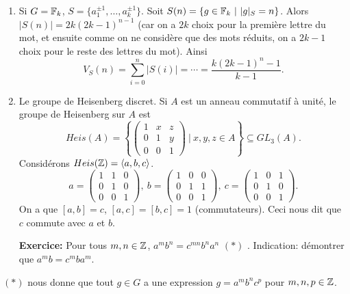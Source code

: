 \begin{exs}
\begin{enumerate}
      \item Si $G = \mathbb{F}_k$, $S = \{a_1^{\pm 1}, \ldots, a_k^{\pm 1}\}$. Soit $S(n) = \{g \in \mathbb{F}_k\ |\ |g|_S =
        n\}$. Alors $|S(n)| = 2k(2k-1)^{n-1}$ (car on a $2k$ choix pour la première lettre du mot, et ensuite
        comme on ne considère que des mots réduits, on a $2k-1$ choix pour le reste des lettres du mot). Ainsi
          \[V_S(n) = \sum_{i=0}^n |S(i)| = \cdots = \frac{k(2k-1)^n-1}{k-1}.\]
       \item Le groupe de Heisenberg discret.
         Si $A$ est un anneau commutatif à unité, le groupe de Heisenberg sur $A$ est 
         \[Heis(A) = \left\{
           \begin{pmatrix}
             1 & x & z \\ 0 & 1 & y \\ 0 & 0 & 1
           \end{pmatrix}\ |\ x,y,z \in A \right\} \subseteq GL_3(A).
         \]
         Considérons $Heis(\mathbb{Z}) = \langle a,b,c \rangle$.
           \[a =
           \begin{pmatrix}
             1 & 1 & 0 \\ 0 & 1 & 0 \\ 0 & 0 & 1
           \end{pmatrix},\ 
           b =
           \begin{pmatrix}
             1 & 0 & 0 \\ 0 & 1 & 1 \\ 0 & 0 & 1
           \end{pmatrix},\ 
           c =
           \begin{pmatrix}
             1 & 0 & 1 \\ 0 & 1 & 0 \\ 0 & 0 & 1
           \end{pmatrix}.
           \]
         On a que $[a,b] = c$, $[a,c] = [b, c] = 1$ (commutateurs). Ceci nous dit que $c$ commute avec $a$ et $b$.
         
         \textbf{Exercice:} Pour tous $m, n \in \mathbb{Z}$, $a^mb^n = c^{mn}b^na^n$ $(\ast)$ . Indication: démontrer que $a^m b
         = c^m ba^m$.
      \end{enumerate}
    \end{exs}

    \begin{rem}
      $(\ast)$ nous donne que tout $g \in G$ a une expression $g = a^mb^nc^p$ pour $m, n, p \in \mathbb{Z}$.
    \end{rem}


